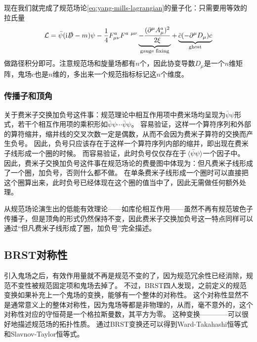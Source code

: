现在我们就完成了规范场论\eqref{eq:yang-mills-lagrangian}的量子化：只需要用等效的拉氏量
\begin{equation}
    \mathcal{L} = \bar{\psi} (\mathrm{i} \slashed{D} - m) \psi - \frac{1}{4} F_{\mu \nu}^a F^{a \ \mu \nu} \underbrace{- \frac{(\partial^\mu A_\mu^a)^2}{2 \xi}}_{\text{gauge fixing}} + \underbrace{\bar{c} (- \partial^\mu D_\mu) c}_{\text{ghost}}
\end{equation}
做路径积分即可。注意规范场和旋量场都有$n$个，因此协变导数$D_\mu$是一个$n$维矩阵，鬼场$c$也是$n$维的，多出来一个规范指标标记这$n$个维度。

\subsubsection{传播子和顶角}

关于费米子交换加负号这件事：规范理论中相互作用项中费米场均呈现为$\bar{\psi} \psi$形式，若干个相互作用项的乘积形如$\bar{\psi} \psi \cdots \bar{\psi} \psi$。
容易验证，这样一个算符序列和外部的算符缩并，缩并线的交叉次数一定是偶数，从而不会因为费米子算符的交换而产生负号。
因此，负号只应该存在于这样一个算符序列内部的缩并，即出现在费米子线形成一个圈的时候。
而容易验证，此时负号仅仅存在于$\expval*{\bar{\psi} \psi}$一个因子中。
因此，费米子交换加负号这件事在规范场论的费曼图中体现为：但凡费米子线形成了一个圈，加负号，否则什么都不做。
在单条费米子线形成一个圈时可以直接把这个圈算出来，此时负号已经体现在这个圈的值当中了，因此无需做任何额外处理。

从规范场论演生出的低能有效理论——如库伦相互作用——虽然不再有规范玻色子传播子，但是顶角的形式仍然保持不变，因此费米子交换加负号这一特点同样可以通过“但凡费米子线形成了圈，加负号”完全描述。

\subsection{BRST对称性}

引入鬼场之后，有效作用量就不再是规范不变的了，因为规范冗余性已经消除，规范不变性被规范固定项和鬼场去掉了。
不过，BRST四人发现，之前定义的规范变换如果补充上一个鬼场的变换，能够有一个整体的对称性。
这个对称性显然不是通常意义上的整体对称性，因为鬼场等都是非物理的，从而，毫不意外的，这个对称性对应的守恒荷是一个格拉斯曼数，其平方为零。
这种变换————可以很好地描述规范场的拓扑性质。
通过BRST变换还可以得到Ward-Takahashi恒等式和Slavnov-Taylor恒等式。

